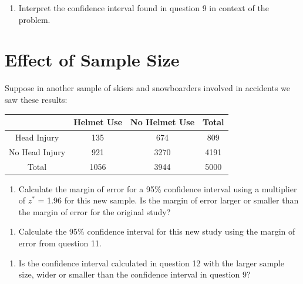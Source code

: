 \documentclass[
]{report}
\providecommand{\tightlist}{%
  \setlength{\itemsep}{0pt}\setlength{\parskip}{0pt}}
\begin{document}
\vspace{1in}

\begin{enumerate}
\def\labelenumi{\arabic{enumi}.}
\setcounter{enumi}{9}
\tightlist
\item
  Interpret the confidence interval found in question 9 in context of the problem.
\end{enumerate}

\vspace{1in}

\hypertarget{effect-of-sample-size}{%
\section{Effect of Sample Size}\label{effect-of-sample-size}}

Suppose in another sample of skiers and snowboarders involved in accidents we saw these results:

\begin{longtable}[]{@{}cccc@{}}
\toprule
& Helmet Use & No Helmet Use & Total\tabularnewline
\midrule
\endhead
Head Injury & 135 & 674 & 809\tabularnewline
No Head Injury & 921 & 3270 & 4191\tabularnewline
Total & 1056 & 3944 & 5000\tabularnewline
\bottomrule
\end{longtable}

\begin{enumerate}
\def\labelenumi{\arabic{enumi}.}
\setcounter{enumi}{10}
\tightlist
\item
  Calculate the margin of error for a 95\% confidence interval using a multiplier of \(z^*\) = 1.96 for this new sample. Is the margin of error larger or smaller than the margin of error for the original study?
\end{enumerate}

\vspace{1in}

\begin{enumerate}
\def\labelenumi{\arabic{enumi}.}
\setcounter{enumi}{11}
\tightlist
\item
  Calculate the 95\% confidence interval for this new study using the margin of error from question 11.
\end{enumerate}

\vspace{1in}

\begin{enumerate}
\def\labelenumi{\arabic{enumi}.}
\setcounter{enumi}{12}
\tightlist
\item
  Is the confidence interval calculated in question 12 with the larger sample size, wider or smaller than the confidence interval in question 9?
\end{enumerate}
\end{document}
